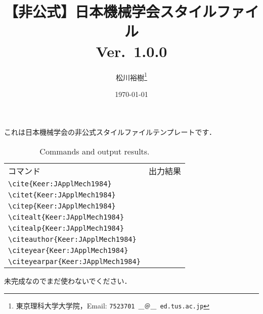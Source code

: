 \documentclass[a4paper,fleqn,12pt,uplatex]{jsarticle}
\title{【非公式】日本機械学会\BibTeX スタイルファイル \\ Ver.~1.0.0}
\author{松川裕樹\thanks{東京理科大学大学院，Email: \texttt{7523701 ＿＠＿ ed.tus.ac.jp}}}
\date{\today}
\begin{document}
\maketitle
\thispagestyle{cover}

これは日本機械学会の非公式\BibTeX スタイルファイルテンプレートです．


\begin{table}[t]
    \centering
    \caption{Commands and output results.}
    \label{tab:my_label}
    \begin{tabular}{ll}
        コマンド &出力結果 \\
        \verb|\cite{Keer:JApplMech1984}|        &\cite{Keer:JApplMech1984} \\
        \verb|\citet{Keer:JApplMech1984}|       &\citet{Keer:JApplMech1984} \\
        \verb|\citep{Keer:JApplMech1984}|       &\citep{Keer:JApplMech1984} \\
        \verb|\citealt{Keer:JApplMech1984}|     &\citealt{Keer:JApplMech1984} \\
        \verb|\citealp{Keer:JApplMech1984}|     &\citealp{Keer:JApplMech1984} \\
        \verb|\citeauthor{Keer:JApplMech1984}|  &\citeauthor{Keer:JApplMech1984} \\
        \verb|\citeyear{Keer:JApplMech1984}|    &\citeyear{Keer:JApplMech1984} \\
        \verb|\citeyearpar{Keer:JApplMech1984}| &\citeyearpar{Keer:JApplMech1984}
    \end{tabular}
\end{table}


未完成なのでまだ使わないでください．

\nocite{*}


% 
\end{document}
